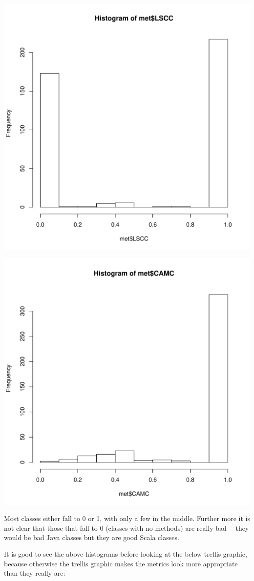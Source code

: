 \documentclass[a4paper]{article}
\begin{document}
\includegraphics[width=0.800\linewidth]{LSCC.pdf}

\includegraphics[width=0.800\linewidth]{CAMC.pdf}

Most classes either fall to 0 or 1, with only a few in the middle. Further more
it is not clear that those that fall to 0 (classes with no methods) are really
bad -{}- they would be bad Java classes but they are good Scala classes.

It is good to see the above histograms before looking at the below trellis
graphic, because otherwise the trellis graphic makes the metrics look more
appropriate than they really are:
\end{document}

